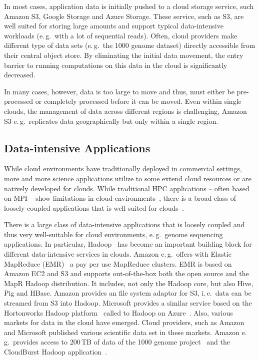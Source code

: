 \documentclass[times]{cpeauth}
\begin{document}
In most cases, application data is initially pushed to a cloud storage
service, such Amazon S3, Google Storage and Azure Storage. These service, such
as S3, are well suited for storing large amounts and support typical
data-intensive workloads (e.\,g.\ with a lot of sequential reads). Often,
cloud providers make different type of data sets (e.\,g.\ the 1000 genome
dataset) directly accessible from their central object store. By eliminating
the initial data movement, the entry barrier to running computations on this
data in the cloud is significantly decreased. 

In many cases, however, data is too large to move and thus, must either be
pre-processed or completely processed before it can be moved. Even within
single clouds, the management of data across different regions is challenging,
Amazon S3 e.\,g.\ replicates data geographically but only within a single
region.




\subsection{Data-intensive Applications}

While cloud environments have traditionally deployed in commercial settings,
more and more science applications utilize to some extend cloud resources or
are natively developed for clouds. While traditional HPC applications -- often
based on MPI -- show limitations in cloud
environments~\cite{Evangelinos2008,Mehrotra:2012:PEA:2287036.2287045}, there
is a broad class of loosely-coupled applications that is well-suited for
clouds~\cite{1851544,Sehgal2011590}.

There is a large class of data-intensive applications that is loosely
coupled and thus very well-suitable for cloud environments, e.\,g.\
genome sequencing applications. In particular, Hadoop~\cite{hadoop}
has become an important building block for different data-intensive
services in clouds. Amazon e.\,g.\ offers with Elastic MapReduce
(EMR)~\cite{amazonemr} a pay per use MapReduce clusters. EMR is based
on Amazon EC2 and S3 and supports out-of-the-box both the open source
and the MapR Hadoop distribution. It includes, not only the
Hadoop core, but also Hive, Pig and HBase. Amazon provides an file
system adaptor for S3, i.\,e.\ data can be streamed from S3 into
Hadoop.  Microsoft provides a similar service based on the Hortonworks
Hadoop platform~\cite{hortonworks} called to Hadoop on
Azure~\cite{hadooponazure}.  Also, various markets for data in the
cloud have emerged. Cloud providers, such as Amazon and Microsoft
published various scientific data set in these markets. Amazon e.\,g.\
provides access to 200\,TB of data of the 1000 genome
project~\cite{amazon-1000genomes} and the CloudBurst Hadoop
application~\cite{schatz2009}.
\end{document}
